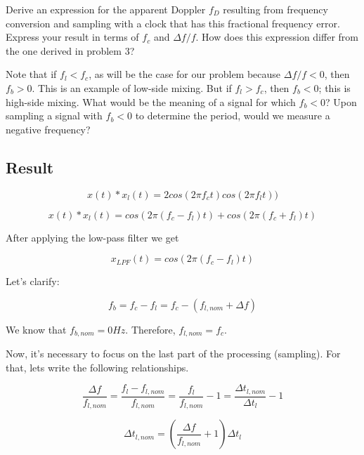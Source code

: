 Derive an expression for the apparent Doppler $f_D$ resulting from frequency
conversion and sampling with a clock that has this fractional frequency error.
Express your result in terms of $f_c$ and $\Delta f /f$. How does this expression
differ from the one derived in problem 3?

Note that if $f_l < f_c$, as will be the case for our problem because
$\Delta f /f < 0$, then $f_b > 0$. This is an example of low-side mixing. But if
$f_l > f_c$, then $f_b < 0$; this is high-side mixing. What would be the meaning
of a signal for which $f_b < 0$? Upon sampling a signal with $f_b < 0$ to
determine the period, would we measure a negative frequency?


\subsection{Result}

\begin{equation}
	x(t) * x_l(t) = 2 cos (2 \pi f_c t) cos(2 \pi f_l t))
\end{equation}

\begin{equation}
	x(t) * x_l(t) =  cos (2 \pi (f_c - f_l) t) + cos(2 \pi (f_c + f_l) t)
\end{equation}

After applying the low-pass filter we get

\begin{equation}
	x_{LPF}(t) = cos (2 \pi (f_c - f_l) t)
\end{equation}

Let's clarify:

\begin{equation}
	f_b = f_c - f_l = f_c - (f_{l,nom} + \Delta f)
\end{equation}

We know that $f_{b,nom} = 0 Hz$. Therefore, $f_{l,nom} = f_c$.

Now, it's necessary to focus on the last part of the processing (sampling). For
that, lets write the following relationships.

\begin{equation}
	\frac{\Delta f}{f_{l,nom}} = \frac{f_l - f_{l,nom}}{f_{l,nom}}
	= \frac{f_l}{f_{l,nom}} - 1
	= \frac{\Delta t_{l,nom}}{\Delta t_l} - 1
\end{equation}


\begin{equation}
	\Delta t_{l,nom} = (\frac{\Delta f}{f_{l,nom}} + 1) \Delta t_l
\end{equation}

